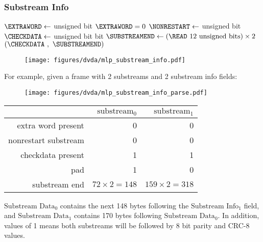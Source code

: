 \subsubsection{Substream Info}
{
$\text{\EXTRAWORD} \leftarrow$  unsigned bit\;
\ASSERT $\text{\EXTRAWORD} = 0$\;
$\text{\NONRESTART} \leftarrow$  unsigned bit\;
$\text{\CHECKDATA} \leftarrow$  unsigned bit\;
 bit\;
$\text{\SUBSTREAMEND} \leftarrow (\text{\READ 12 unsigned bits}) \times 2$\;
\Return $(\text{\CHECKDATA}~,~\text{\SUBSTREAMEND})$\;
\EALGORITHM
}
\begin{figure}[h]
  \texttt{[image: figures/dvda/mlp\_substream\_info.pdf]}
\end{figure}
\par
\noindent
For example, given a frame with 2 substreams
and 2 substream info fields:
\begin{figure}[h]
  \texttt{[image: figures/dvda/mlp\_substream\_info\_parse.pdf]}
\end{figure}
\begin{table}[h]
\begin{tabular}{rrr}
& $\text{substream}_0$ & $\text{substream}_1$ \\
\hline
extra word present & 0 & 0 \\
nonrestart substream & 0 & 0 \\
checkdata present & 1 & 1 \\
pad & 1 & 0 \\
substream end & $72 \times 2 = 148$ & $159 \times 2 = 318$ \\
\end{tabular}
\end{table}
\par
\noindent
$\text{Substream Data}_0$ contains
the next 148 bytes following the $\text{Substream Info}_1$ field,
and $\text{Substream Data}_1$ contains 170 bytes
following $\text{Substream Data}_0$.
In addition,  values of 1
means both substreams will be followed by 8 bit parity and CRC-8 values.

\clearpage

